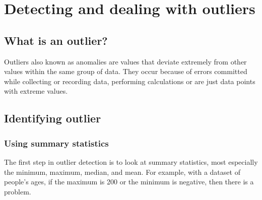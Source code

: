 \documentclass[
]{book}
\begin{document}
\hypertarget{detecting-and-dealing-with-outliers}{%
\section{Detecting and dealing with outliers}\label{detecting-and-dealing-with-outliers}}

\hypertarget{what-is-an-outlier}{%
\subsection{What is an outlier?}\label{what-is-an-outlier}}

Outliers also known as anomalies are values that deviate extremely from other values within the same group of data. They occur because of errors committed while collecting or recording data, performing calculations or are just data points with extreme values.

\hypertarget{identifying-outlier}{%
\subsection{Identifying outlier}\label{identifying-outlier}}

\hypertarget{using-summary-statistics}{%
\subsubsection{Using summary statistics}\label{using-summary-statistics}}

The first step in outlier detection is to look at summary statistics, most especially the minimum, maximum, median, and mean. For example, with a dataset of people's ages, if the maximum is 200 or the minimum is negative, then there is a problem.
\end{document}

